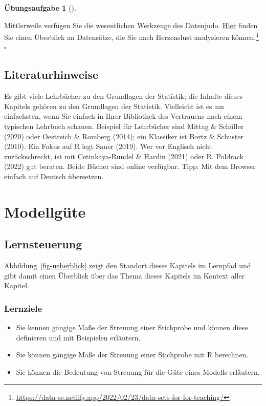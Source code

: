 \documentclass[
  a4paper,
]{scrbook}
\providecommand{\tightlist}{%
  \setlength{\itemsep}{0pt}\setlength{\parskip}{0pt}}\usepackage{longtable,booktabs,array}
\theoremstyle{definition}
\theoremstyle{definition}
\theoremstyle{definition}
\newtheorem{exercise}{Übungsaufgabe}[chapter]
\theoremstyle{remark}
\begin{document}
\begin{exercise}[]\protect\hypertarget{exr-datensaetze}{}\label{exr-datensaetze}

Mittlerweile verfügen Sie die wesentlichen Werkzeuge des Datenjudo.
\href{https://data-se.netlify.app/2022/02/23/data-sets-for-for-teaching/}{Hier}
finden Sie einen Überblick an Datensätze, die Sie nach Herzenslust
analysieren können.\footnote{\url{https://data-se.netlify.app/2022/02/23/data-sets-for-for-teaching/}}
\(\square\)

\end{exercise}

\section{Literaturhinweise}\label{literaturhinweise-3}

Es gibt viele Lehrbücher zu den Grundlagen der Statistik; die Inhalte
dieses Kapitels gehören zu den Grundlagen der Statistik. Vielleicht ist
es am einfachsten, wenn Sie einfach in Ihrer Bibliothek des Vertrauens
nach einem typischen Lehrbuch schauen. Beispiel für Lehrbücher sind
Mittag \& Schüller (2020) oder Oestreich \& Romberg (2014); ein
Klassiker ist Bortz \& Schuster (2010). Ein Fokus auf R legt Sauer
(2019). Wer vor Englisch nicht zurückschreckt, ist mit Cetinkaya-Rundel
\& Hardin (2021) oder R. Poldrack (2022) gut beraten. Beide Bücher sind
online verfügbar. Tipp: Mit dem Browser einfach auf Deutsch übersetzen.

\chapter{Modellgüte}\label{modellguxfcte}

\section{Lernsteuerung}\label{lernsteuerung-5}

Abbildung~\ref{fig-ueberblick} zeigt den Standort dieses Kapitels im
Lernpfad und gibt damit einen Überblick über das Thema dieses Kapitels
im Kontext aller Kapitel.

\subsection{Lernziele}\label{lernziele-6}

\begin{itemize}
\tightlist
\item
  Sie kennen gängige Maße der Streuung einer Stichprobe und können diese
  definieren und mit Beispielen erläutern.
\item
  Sie können gängige Maße der Streuung einer Stichprobe mit R berechnen.
\item
  Sie können die Bedeutung von Streuung für die Güte eines Modells
  erläutern.
\end{itemize}
\end{document}
